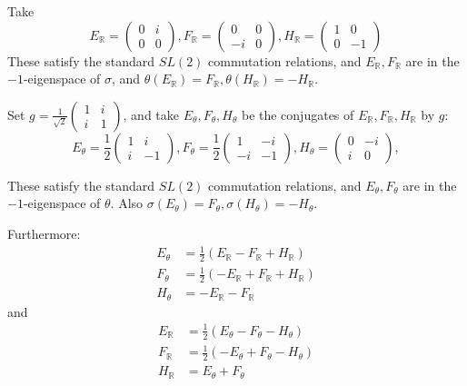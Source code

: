 \documentclass[10pt,leqno]{article}
\newcommand{\R}{\mathbb R}
\begin{document}
Take
$$
E_\R=\begin{pmatrix}0&i\\0&0\end{pmatrix},
F_\R=\begin{pmatrix}0&0\\-i&0\end{pmatrix},
H_\R=\begin{pmatrix}1&0\\0&-1\end{pmatrix}
$$
These satisfy the standard $SL(2)$ commutation relations, and $E_\R,F_\R$ are in the $-1$-eigenspace of $\sigma$,
and $\theta(E_\R)=F_\R, \theta(H_\R)=-H_\R$.

Set $g=\frac 1{\sqrt 2}\begin{pmatrix}1&i\\i&1
\end{pmatrix}$, and take $E_\theta,F_\theta,H_\theta$ be the conjugates of $E_\R,F_\R,H_\R$ by $g$:
$$
E_\theta=\frac12\begin{pmatrix}1&i\\i&-1\end{pmatrix},
F_\theta=\frac12\begin{pmatrix}1&-i\\-i&-1\end{pmatrix},
H_\theta=\begin{pmatrix}0&-i\\i&0\end{pmatrix},
$$


These satisfy the standard $SL(2)$ commutation relations, and $E_\theta,F_\theta$ are in the $-1$-eigenspace of $\theta$.
Also $\sigma(E_\theta)=F_\theta,\sigma(H_\theta)=-H_\theta$.

Furthermore:
$$
\begin{aligned}
  E_\theta&=\frac12(E_\R-F_\R+H_\R)\\
  F_\theta&=\frac12(-E_\R+F_\R+H_\R)\\
  H_\theta&=-E_\R-F_\R
\end{aligned}
$$
and
$$
\begin{aligned}
  E_\R&=\frac12(E_\theta-F_\theta-H_\theta)\\
  F_\R&=\frac12(-E_\theta+F_\theta-H_\theta)\\
  H_\R&=E_\theta+F_\theta
\end{aligned}
$$





\end{document}
